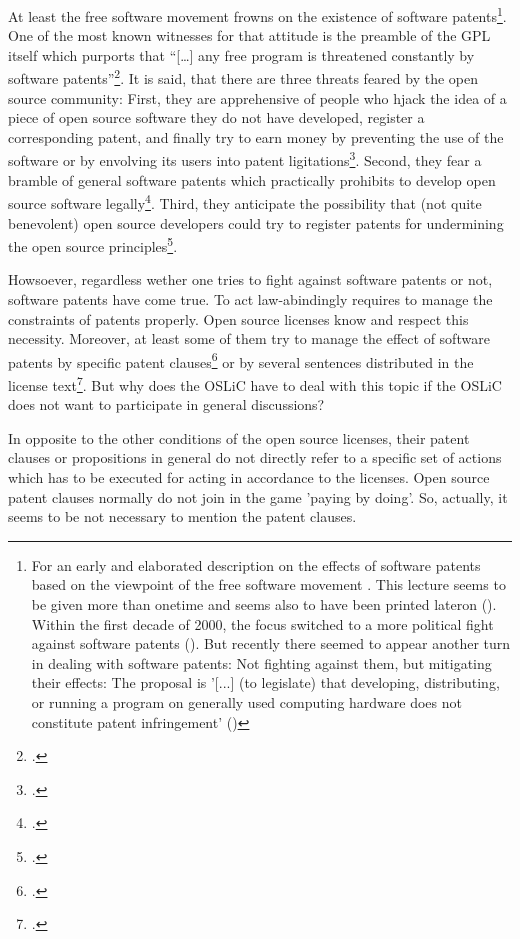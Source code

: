 At least the free software movement frowns on the existence of software
patents\footnote{For an early and elaborated description on the effects of
software patents based on the viewpoint of the free software movement
\cite[see][\nopage wp]{Stallman2001a}. This lecture seems to be given more
than onetime and seems also to have been printed lateron (\cite[cf.][\nopage
wp]{Stallman2002a}). Within the first decade of 2000, the focus switched to a
more political fight against software patents (\cite[cf.][\nopage
wp]{Stallman2004a}). But recently there seemed to appear another turn in dealing
with software patents: Not fighting against them, but mitigating their effects:
The proposal is '[...] (to legislate) that developing, distributing, or running
a program on generally used computing hardware does not constitute patent
infringement' (\cite[cf.][\nopage wp]{Stallman2012a})}. One of the most known
witnesses for that attitude is the preamble of the GPL itself which purports
that \enquote{[\ldots] any free program is threatened constantly by software
patents}\footcite[cf.][wp]{Gpl20OsiLicense1991a}. It is said, that there are
three threats feared by the open source community: First, they are apprehensive
of people who hjack the idea of a piece of open source software they do not have
developed, register a corresponding patent, and finally try to earn money by
preventing the use of the software or by envolving its users into patent
ligitations\footcite[cf.][234]{JaeMet2011a}. Second, they fear a bramble of
general software patents which practically prohibits to develop open source
software legally\footcite[cf.][234]{JaeMet2011a}. Third, they anticipate the
possibility that (not quite benevolent) open source developers could try to
register patents for undermining the open source
principles\footcite[cf.][235]{JaeMet2011a}.

Howsoever, regardless wether one tries to fight against software patents or not,
software patents have come true. To act law-abindingly requires to manage the
constraints of patents properly. Open source licenses know and respect this
necessity. Moreover, at least some of them try to manage the effect of software
patents by specific patent clauses\footcite[pars pro toto cf.][\nopage wp.
§3]{Apl20OsiLicense2004a} or by several sentences distributed in the license
text\footcite[pars pro toto cf.][\nopage wp.]{Epl10OsiLicense2005a}. But why
does the OSLiC have to deal with this topic if the OSLiC does not want to
participate in general discussions?

In opposite to the other conditions of the open source licenses, their patent
clauses or propositions in general do not directly refer to a specific set of
actions which has to be executed for acting in accordance to the licenses. Open
source patent clauses normally do not join in the game 'paying by doing'. So,
actually, it seems to be not necessary to mention the patent clauses.

